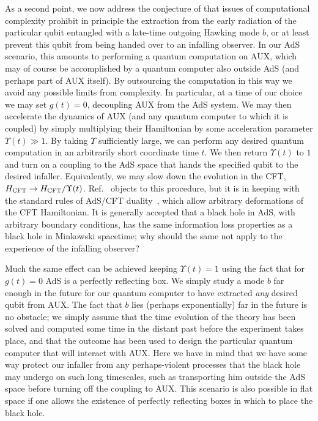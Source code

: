 \documentclass[12pt]{article}
\begin{document}
{{{As a second point, we now} address the conjecture of \cite{Harlow:2013tf} that issues of computational complexity prohibit in principle the extraction from the early radiation of the particular qubit entangled with a late-time outgoing Hawking mode $b$, or at least prevent this qubit from being handed over to an infalling observer.  In our AdS scenario, this amounts to performing a quantum computation on AUX, which may of course be accomplished by a quantum computer also outside AdS (and perhaps part of AUX itself). By outsourcing the computation in this way we avoid any possible limits from complexity.  In particular, at a time of our choice we may set $g(t)=0$, decoupling AUX from the AdS system.  We may then accelerate the dynamics of AUX (and any quantum computer to which it is coupled) by simply multiplying their Hamiltonian by some acceleration parameter $\Upsilon (t) \gg 1$.  By taking $\Upsilon$ sufficiently large, we can perform any desired quantum computation in an arbitrarily short coordinate time $t$.  We then return $\Upsilon (t)$ to $1$ and turn on a coupling to the AdS space that hands the specified qubit to the desired infaller.  Equivalently, we may slow down the evolution in the CFT, $H_{\rm CFT} \to H_{\rm CFT} / \Upsilon (t)$.  Ref.~\cite{Harlow:2013tf} objects to this procedure, but it is in keeping with the standard rules of AdS/CFT duality~\cite{GKP,W}, which allow arbitrary deformations of the CFT Hamiltonian.  It is generally accepted that a black hole in AdS, with arbitrary boundary conditions, has the same information loss properties as a black hole in Minkowski spacetime; why should the same not apply to the experience of the infalling observer?

Much the same effect can be achieved keeping $\Upsilon(t) =1$ using the fact that for $g(t)=0$ AdS is a perfectly reflecting box.  We simply study a mode $b$ far enough in the future for our quantum computer to have extracted {\it any} desired qubit from AUX.  The fact that $b$ lies (perhaps exponentially) far in the future is no obstacle; we simply assume that the time evolution of the theory has been solved and computed some time in the distant past before the experiment takes place, and that the outcome has been used to design the particular quantum computer that will interact with AUX.   {Here we have in mind that we have some way protect our infaller from any perhaps-violent processes that the black hole may undergo on such long timescales, such as transporting him outside the AdS space before turning off the coupling to AUX.} This scenario is also possible in flat space if one allows the existence of perfectly reflecting boxes in which to place the black hole.




}}
\end{document}
